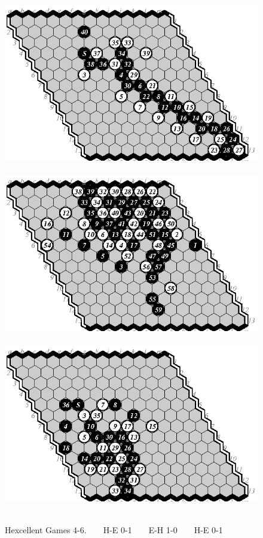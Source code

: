 \documentclass{icga}
\def\Hent{\mbox{\sc Hexcellent}}
\begin{document}
\begin{figure}[hbp]
\hspace*{-2cm}\
\includegraphics[scale=1]{pix/13.he2.eps}\hspace*{-2cm}\
\includegraphics[scale=1]{pix/13.eh3.eps}\hspace*{-2cm}\
\includegraphics[scale=1]{pix/13.he4.eps}\hspace*{-2cm}\
\caption{\Hent{} Games 4-6. ~ ~ H-E 0-1 ~ ~ E-H 1-0 ~ ~ H-E 0-1}
\end{figure}
\end{document}
